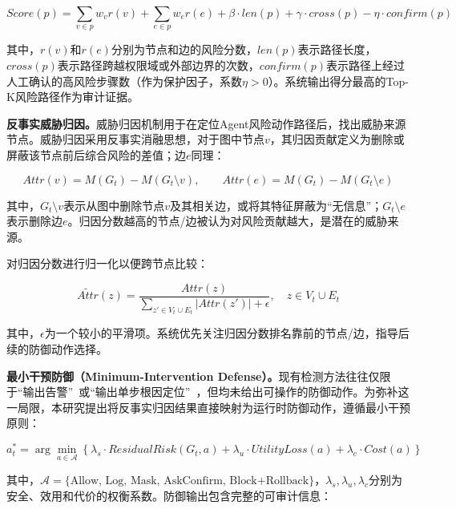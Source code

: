 \begin{equation}
  Score(p) = \sum_{v \in p} w_v r(v) + \sum_{e \in p} w_e r(e) + \beta \cdot len(p) + \gamma \cdot cross(p) - \eta \cdot confirm(p)
\end{equation}

其中，$r(v)$和$r(e)$分别为节点和边的风险分数，$len(p)$表示路径长度，$cross(p)$表示路径跨越权限域或外部边界的次数，$confirm(p)$表示路径上经过人工确认的高风险步骤数（作为保护因子，系数$\eta > 0$）。系统输出得分最高的Top-K风险路径作为审计证据。

\textbf{反事实威胁归因。}威胁归因机制用于在定位Agent风险动作路径后，找出威胁来源节点。威胁归因采用反事实消融思想，对于图中节点$v$，其归因贡献定义为删除或屏蔽该节点前后综合风险的差值；边$e$同理：

\begin{equation}
  Attr(v) = M(G_t) - M(G_t \setminus v), \qquad Attr(e) = M(G_t) - M(G_t \setminus e)
\end{equation}

其中，$G_t \setminus v$表示从图中删除节点$v$及其相关边，或将其特征屏蔽为“无信息”；$G_t \setminus e$表示删除边$e$。归因分数越高的节点/边被认为对风险贡献越大，是潜在的威胁来源。

对归因分数进行归一化以便跨节点比较：

\begin{equation}
  \widetilde{Attr}(z) = \frac{Attr(z)}{\sum_{z' \in V_t \cup E_t} |Attr(z')| + \epsilon}, \quad z \in V_t \cup E_t
\end{equation}

其中，$\epsilon$为一个较小的平滑项。系统优先关注归因分数排名靠前的节点/边，指导后续的防御动作选择。

\textbf{最小干预防御（Minimum-Intervention Defense）。}现有检测方法往往仅限于“输出告警”~\cite{wang2025agentarmor,liu2026auditing}或“输出单步根因定位”~\cite{wang2026agenttrace}，但均未给出可操作的防御动作。为弥补这一局限，本研究提出将反事实归因结果直接映射为运行时防御动作，遵循最小干预原则：

\begin{equation}
  a_t^* = \arg\min_{a \in \mathcal{A}} \left\{\lambda_s \cdot ResidualRisk(G_t, a) + \lambda_u \cdot UtilityLoss(a) + \lambda_c \cdot Cost(a)\right\}
  \label{eq:min_intervention}
\end{equation}

其中，$\mathcal{A} = \{\text{Allow, Log, Mask, AskConfirm, Block+Rollback}\}$，$\lambda_s, \lambda_u, \lambda_c$分别为安全、效用和代价的权衡系数。防御输出包含完整的可审计信息：

